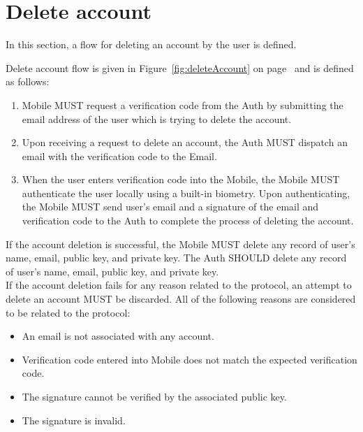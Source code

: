 \section{Delete account}
In this section, a flow for deleting an account by the user is defined. 
\medskip

Delete account flow is given in Figure~\ref{fig:deleteAccount} on page~\pageref{fig:deleteAccount} and is defined 
as follows:
    \begin{enumerate}
        \item Mobile MUST request a verification code from the Auth by submitting the email address of the user
                which is trying to delete the account.
        \item Upon receiving a request to delete an account, the Auth MUST dispatch an email with the verification
                code to the Email.
        \item When the user enters verification code into the Mobile, the Mobile MUST authenticate the user locally 
                using a built-in biometry. Upon authenticating, the Mobile MUST send user's email and a signature 
                of the email and verification code to the Auth to complete the process of deleting the account.
    \end{enumerate}
    
If the account deletion is successful, the Mobile MUST delete any record of user's name, email, public key, and 
private key. The Auth SHOULD delete any record of user's name, email, public key, and private key.\\
If the account deletion fails for any reason related to the protocol, an attempt to delete an account MUST be 
discarded. All of the following reasons are considered to be related to the protocol:
    \begin{itemize}
        \item An email is not associated with any account.
        \item Verification code entered into Mobile does not match the expected verification code.
        \item The signature cannot be verified by the associated public key.
        \item The signature is invalid.
    \end{itemize}
